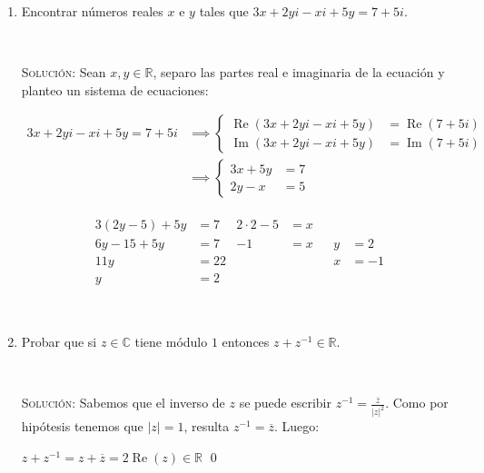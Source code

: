\documentclass[a4paper,12pt,twoside,spanish,reqno]{amsbook}
\numberwithin{equation}{section}
\newcommand{\rta}{\noindent\textsc{Solución: }}
\begin{document}
\begin{enumerate}
\newpage

\item Encontrar números reales $x$ e $y$ tales que $3x+2yi-xi+5y = 7 + 5i$.

\

\rta Sean $x, y \in \mathbb{R}$, separo las partes real e imaginaria de la ecuación y planteo un sistema de ecuaciones:

\begin{equation*}
\begin{array}{rl}
3x+2yi-xi+5y = 7 + 5i &\implies \left\{ \begin{array}{rl}
\operatorname{Re} (3x+2yi-xi+5y) &= \operatorname{Re} ( 7 + 5i)	\\
\operatorname{Im} (3x+2yi-xi+5y) &= \operatorname{Im}( 7 + 5i)
\end{array}\right. \\
&\implies \left\{ \begin{array}{rl}
3x+ 5y &= 7	\\
2y -x &= 5
\end{array}\right.
\end{array}
\end{equation*}

\begin{equation*}
\begin{array}{l|r}
\begin{array}{rl|rl}
3 (2y -5) + 5y &= 7		 &	2 \cdot 2 - 5 &= x \\
6y - 15 + 5 y &= 7		 &	-1 &= x \\
11 y &= 22	& &  \\
y &= 2		& & 
\end{array} & 
\boxed{\begin{array}{rl}
y &= 2 \\
x &= -1
\end{array}}
\end{array}
\end{equation*}

\



\item Probar que si $z \in \mathbb{C}$ tiene módulo $1$ entonces $z + z^{-1} \in \mathbb{R}$.

\

\rta Sabemos que el inverso de $z$ se puede escribir $z^{-1} = \frac{\overline{z} }{|z|^2}$. Como por hipótesis tenemos que $|z|=1$, resulta $z^{-1} = \overline{z}$. Luego:

$z + z^{-1} = z + \overline{z} = 2 \operatorname{Re} (z) \in \mathbb{R}$ \qed 


\end{enumerate}
\end{document}
